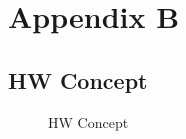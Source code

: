 \chapter{Appendix B}
\label{cha:Appendix B}


\section{HW Concept}
\label{sec:HW Concept}
\begin{figure}[H]
	\centering
	\caption{HW Concept}
	\label{fig:HW Concept}
\end{figure}


